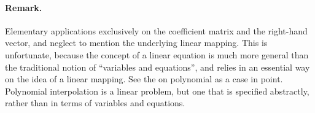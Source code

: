 \documentclass[12pt]{article}
\begin{document}
\paragraph{Remark.} Elementary applications  exclusively on the
coefficient matrix and the right-hand vector, and neglect to mention
the underlying linear mapping.  This is unfortunate, because the
concept of a linear equation is much more general than the traditional
notion of ``variables and equations'', and relies in an essential way
on the idea of a linear mapping.  See the
 on
polynomial as a case in point.  Polynomial interpolation
is a linear problem, but one that is specified abstractly, rather than
in terms of variables and equations.
\end{document}
